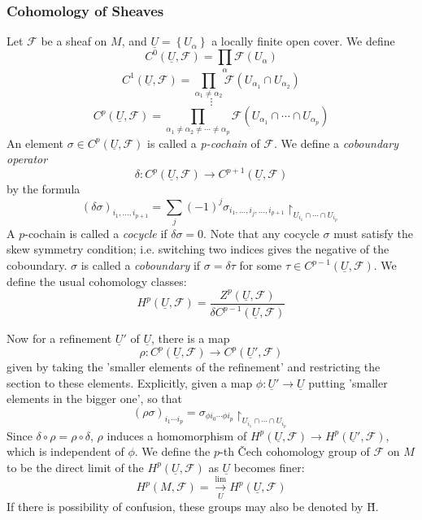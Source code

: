 \subsubsection{Cohomology of Sheaves}

Let $ \mathcal{F}$ be a sheaf on $M$, and $\underline{U} = \left\{ U_{\alpha} \right\} $ a locally finite open cover. We define
\[
	C^0 \left( \underline{U}, \mathcal{F} \right) = \prod_{\alpha} \mathcal{F}(U_{\alpha})
\]
\[
	C^1 \left( \underline{U}, \mathcal{F} \right) = \prod_{\alpha_1 \neq \alpha_2} \mathcal{F} \left( U_{\alpha_1} \cap U_{\alpha_2} \right) 
\]
\[
\vdots
\]
\[
	C^p( \underline{U}, \mathcal{F}) = \prod_{\alpha_1 \neq \alpha_2 \neq \cdots \neq \alpha_p} \mathcal{F} \left( U_{\alpha_1} \cap \cdots \cap U_{\alpha_p} \right) 
\]
An element $\sigma \in C^p \left( \underline{U}, \mathcal{F} \right) $ is called a \textit{p-cochain} of $ \mathcal{F}$. We define a \textit{coboundary operator}
\[
	\delta: C^p \left( \underline{U}, \mathcal{F} \right)  \to C^{p+1} \left( \underline{U}, \mathcal{F} \right) 
\]
by the formula
\[
	\left( \delta \sigma \right)_{i_1, \ldots, i_{p+1}} = \sum_j (-1)^j \sigma_{i_1, \ldots, i_j, \ldots, i_{p+1}} \restriction_{U_{i_1} \cap \cdots \cap U_{i_p}}
\]
\indent A $p$-cochain is called a \textit{cocycle} if $\delta \sigma = 0$. Note that any cocycle $\sigma$ must satisfy the skew symmetry condition; i.e. switching two indices gives the negative of the coboundary. $\sigma$ is called a \textit{coboundary} if $\sigma = \delta \tau$ for some $\tau \in C^{p-1} \left( \underline{U}, \mathcal{F} \right)$. We define the usual cohomology classes:
\[
H^p \left( \underline{U}, \mathcal{F} \right) = \frac{Z^p \left( \underline{U}, \mathcal{F} \right) }{\delta C^{p-1} \left( \underline{U}, \mathcal{F} \right) }
\]

Now for a refinement $ \underline{U}'$ of $ \underline{U}$, there is a map
\[
	\rho: C^p( \underline{U}, \mathcal{F}) \to C^p \left( \underline{U}', \mathcal{F} \right) 
\]
given by taking the 'smaller elements of the refinement' and restricting the section to these elements. Explicitly, given a map $\phi: \underline{U}' \to \underline{U}$ putting 'smaller elements in the bigger one', so that
\[
	\left( \rho \sigma \right)_{i_1 \cdots i_p} = \sigma_{ \phi i_0 \cdots \phi i_p} \restriction_{ U_{i_1} \cap \cdots \cap U_{i_p} }
\]
Since $\delta \circ \rho = \rho \circ \delta$, $\rho$ induces a homomorphism of $H^p \left( \underline{U}, \mathcal{F} \right) \to H^p \left( \underline{U}', \mathcal{F} \right) $, which is independent of $\phi$. We define the $p$-th \v{C}ech cohomology group of $ \mathcal{F}$ on $M$ to be the direct limit of the $H^p \left( \underline{U}, \mathcal{F} \right) $ as $ \underline{U}$ becomes finer:
\[
	H^p \left( M, \mathcal{F} \right) = \xrightarrow[U]{ \mathrm{lim} } H^p \left( \underline{U}, \mathcal{F} \right) 
\]
If there is possibility of confusion, these groups may also be denoted by \v{H}.


